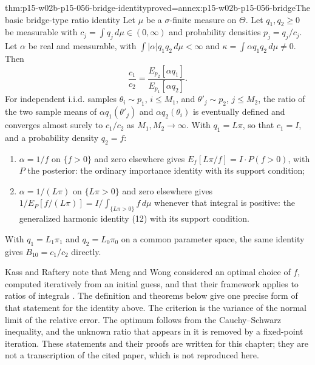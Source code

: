 \begin{hbtheorem}{thm:p15-w02b-p15-056-bridge-identity}{proved=annex:p15-w02b-p15-056-bridge}{The basic bridge-type ratio identity}
Let \(\mu\) be a \(\sigma\)-finite measure on \(\Theta\). Let
\(q_1,q_2\geq0\) be measurable with
\(c_j=\int q_j\,d\mu\in(0,\infty)\) and probability densities
\(p_j=q_j/c_j\). Let \(\alpha\) be real and measurable, with
\(\int|\alpha|q_1q_2\,d\mu<\infty\) and
\(\kappa=\int\alpha q_1q_2\,d\mu\neq0\). Then
\[
 \frac{c_1}{c_2}=\frac{E_{p_2}[\alpha q_1]}{E_{p_1}[\alpha q_2]} .
\]
For independent i.i.d. samples \(\theta_i\sim p_1\), \(i\leq M_1\), and
\(\theta'_j\sim p_2\), \(j\leq M_2\), the ratio of the two sample means
of \(\alpha q_1(\theta'_j)\) and \(\alpha q_2(\theta_i)\) is eventually
defined and converges almost surely to \(c_1/c_2\) as
\(M_1,M_2\to\infty\). With \(q_1=L\pi\), so that \(c_1=I\), and a
probability density \(q_2=f\):
\begin{enumerate}
\item \(\alpha=1/f\) on \(\{f>0\}\) and zero elsewhere gives
\(E_f[L\pi/f]=I\cdot P(f>0)\), with \(P\) the posterior: the ordinary
importance identity with its support condition;
\item \(\alpha=1/(L\pi)\) on \(\{L\pi>0\}\) and zero elsewhere gives
\(1/E_P[f/(L\pi)]=I/\int_{\{L\pi>0\}}f\,d\mu\) whenever that integral
is positive: the generalized harmonic identity (12) with its support
condition.
\end{enumerate}
With \(q_1=L_1\pi_1\) and \(q_2=L_0\pi_0\) on a common parameter space,
the same identity gives \(B_{10}=c_1/c_2\) directly.
\end{hbtheorem}

Kass and Raftery note that Meng and Wong considered an optimal choice of
\(f\), computed iteratively from an initial guess, and that their framework
applies to ratios of integrals
\cite[Sec.~4.3, p.~780]{KassRaftery1995BayesFactors}. The definition and
theorems below give one precise form of that statement for the identity
above. The criterion is the variance of the normal limit of the relative
error. The optimum follows from the Cauchy--Schwarz inequality, and the
unknown ratio that appears in it is removed by a fixed-point iteration.
These statements and their proofs are written for this chapter; they are
not a transcription of the cited paper, which is not reproduced here.

